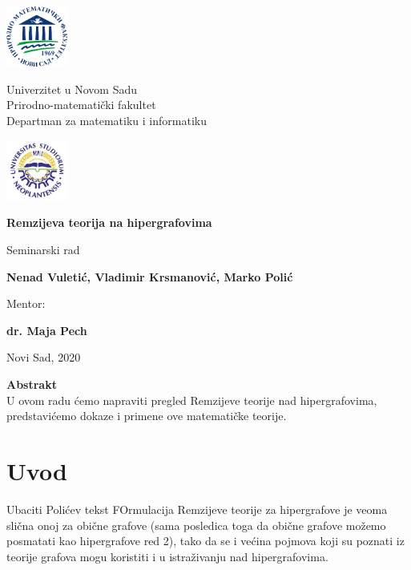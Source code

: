 \documentclass[a4paper]{article}
\newcommand{\autor}{ \centering Nenad Vuletić, Vladimir Krsmanović, Marko Polić}
\newcommand{\naslov}{Remzijeva teorija na hipergrafovima}
\newcommand{\datum}{Novi Sad, 2020}
\newcommand{\mentor}{dr. Maja Pech}
\begin{document}
	\begin{center}
		
		\includegraphics[width=2cm]{grbPMF}\hfill
		\parbox[b]{45ex}{\centering 
			Univerzitet u Novom Sadu\\
			Prirodno-matematički fakultet\\
			Departman za matematiku i informatiku}\hfill 
		\includegraphics[width=2cm]{grbUNS}
		
		\vspace{22ex}
				
		{\Huge {\bf \setlength{\baselineskip}{1.5\baselineskip}\naslov}}
		
		\vspace{4ex}
		Seminarski rad
		
		\vspace{12ex}
		\parbox[b]{\textwidth}{{\Large {\bf \hspace{1cm}\autor}}}
		\vspace{10ex}
		
		{\Large Mentor:}
		
		{\Large  \textbf{\mentor}}
		
		\vfill
		
		\datum
		
	\end{center}
	\thispagestyle{empty}
	\newpage	
	\vfill
	\begin{center}
		\textbf{Abstrakt}\\
		U ovom radu ćemo napraviti pregled Remzijeve teorije nad hipergrafovima, predstavićemo dokaze i primene ove matematičke teorije.
		\thispagestyle{empty}
	\end{center}
	\pagebreak
	\tableofcontents
	\newpage
	\section{Uvod}
	Ubaciti Polićev tekst
	FOrmulacija Remzijeve teorije za hipergrafove je veoma slična onoj za obične grafove (sama posledica toga da obične grafove možemo posmatati kao hipergrafove red 2), tako da se i većina pojmova koji su poznati iz teorije grafova mogu koristiti i u istraživanju nad hipergrafovima.
\end{document}
